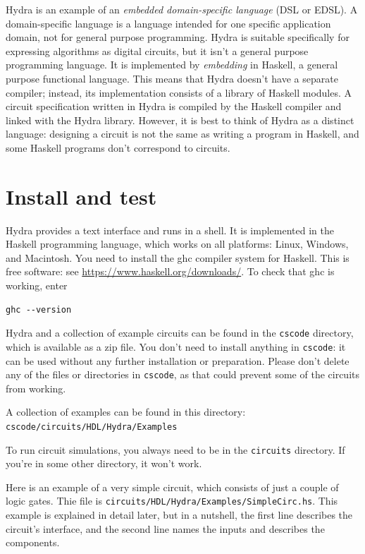 \documentclass[]{svmono}
\begin{document}
Hydra is an example of an \emph{embedded domain-specific language} (DSL
or EDSL).  A domain-specific language is a language intended for
one specific application domain, not for general purpose
programming.  Hydra is suitable specifically for expressing
algorithms as digital circuits, but it isn't a general purpose
programming language.  It is implemented by \emph{embedding} in
Haskell, a general purpose functional language.  This means that
Hydra doesn't have a separate compiler; instead, its
implementation consists of a library of Haskell modules. A circuit
specification written in Hydra is compiled by the Haskell compiler
and linked with the Hydra library.  However, it is best to think
of Hydra as a distinct language: designing a circuit is not the
same as writing a program in Haskell, and some Haskell programs
don't correspond to circuits.
\section*{Install and test}
\label{sec:org4ce4972}

Hydra provides a text interface and runs in a shell.  It is
implemented in the Haskell programming language, which works on
all platforms: Linux, Windows, and Macintosh.  You need to install
the ghc compiler system for Haskell.  This is free software: see
\url{https://www.haskell.org/downloads/}.  To check that ghc is
working, enter

\begin{verbatim}
ghc --version
\end{verbatim}

Hydra and a collection of example circuits can be found in the
\texttt{cscode} directory, which is available as a zip file.  You don't
need to install anything in \texttt{cscode}: it can be used without any
further installation or preparation.  Please don't delete any of
the files or directories in \texttt{cscode}, as that could prevent some
of the circuits from working.

A collection of examples can be found in this directory:\\
\texttt{cscode/circuits/HDL/Hydra/Examples}

To run circuit simulations, you always need to be in the
\texttt{circuits} directory.  If you're in some other directory, it
won't work.

Here is an example of a very simple circuit, which consists of
just a couple of logic gates.  Thie file is
\texttt{circuits/HDL/Hydra/Examples/SimpleCirc.hs}.  This example is
explained in detail later, but in a nutshell, the first line
describes the circuit's interface, and the second line names the
inputs and describes the components.
\end{document}
